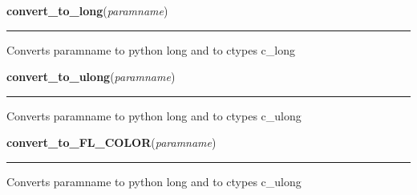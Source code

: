     \label{xformslib:library:convert_to_long}

    \vspace{0.5ex}

\hspace{.8\funcindent}\begin{boxedminipage}{\funcwidth}

    \raggedright \textbf{convert\_to\_long}(\textit{paramname})

    \vspace{-1.5ex}

    \rule{\textwidth}{0.5\fboxrule}
\setlength{\parskip}{2ex}
    Converts paramname to python long and to ctypes c\_long

\setlength{\parskip}{1ex}
    \end{boxedminipage}

    \label{xformslib:library:convert_to_ulong}

    \vspace{0.5ex}

\hspace{.8\funcindent}\begin{boxedminipage}{\funcwidth}

    \raggedright \textbf{convert\_to\_ulong}(\textit{paramname})

    \vspace{-1.5ex}

    \rule{\textwidth}{0.5\fboxrule}
\setlength{\parskip}{2ex}
    Converts paramname to python long and to ctypes c\_ulong

\setlength{\parskip}{1ex}
    \end{boxedminipage}

    \label{xformslib:library:convert_to_ulong}

    \vspace{0.5ex}

\hspace{.8\funcindent}\begin{boxedminipage}{\funcwidth}

    \raggedright \textbf{convert\_to\_FL\_COLOR}(\textit{paramname})

    \vspace{-1.5ex}

    \rule{\textwidth}{0.5\fboxrule}
\setlength{\parskip}{2ex}
    Converts paramname to python long and to ctypes c\_ulong

\setlength{\parskip}{1ex}
    \end{boxedminipage}

